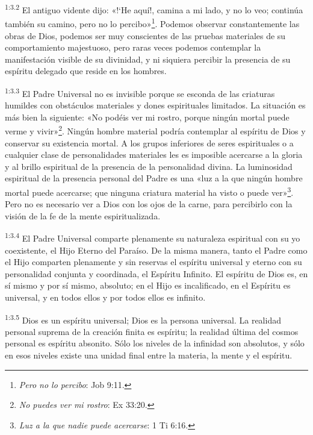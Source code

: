 \par
\textsuperscript{1:3.2} El antiguo vidente dijo: «!`He aquí!, camina a mi lado, y no lo veo; continúa también su camino, pero no lo percibo»\footnote{\textit{Pero no lo percibo}: Job 9:11.}. Podemos observar constantemente las obras de Dios, podemos ser muy conscientes de las pruebas materiales de su comportamiento majestuoso, pero raras veces podemos contemplar la manifestación visible de su divinidad, y ni siquiera percibir la presencia de su espíritu delegado que reside en los hombres.

\par
\textsuperscript{1:3.3} El Padre Universal no es invisible porque se esconda de las criaturas humildes con obstáculos materiales y dones espirituales limitados. La situación es más bien la siguiente: «No podéis ver mi rostro, porque ningún mortal puede verme y vivir»\footnote{\textit{No puedes ver mi rostro}: Ex 33:20.}. Ningún hombre material podría contemplar al espíritu de Dios y conservar su existencia mortal. A los grupos inferiores de seres espirituales o a cualquier clase de personalidades materiales les es imposible acercarse a la gloria y al brillo espiritual de la presencia de la personalidad divina. La luminosidad espiritual de la presencia personal del Padre es una «luz a la que ningún hombre mortal puede acercarse; que ninguna criatura material ha visto o puede ver»\footnote{\textit{Luz a la que nadie puede acercarse}: 1 Ti 6:16.}. Pero no es necesario ver a Dios con los ojos de la carne, para percibirlo con la visión de la fe de la mente espiritualizada.

\par
\textsuperscript{1:3.4} El Padre Universal comparte plenamente su naturaleza espiritual con su yo coexistente, el Hijo Eterno del Paraíso. De la misma manera, tanto el Padre como el Hijo comparten plenamente y sin reservas el espíritu universal y eterno con su personalidad conjunta y coordinada, el Espíritu Infinito. El espíritu de Dios es, en sí mismo y por sí mismo, absoluto; en el Hijo es incalificado, en el Espíritu es universal, y en todos ellos y por todos ellos es infinito.

\par
\textsuperscript{1:3.5} Dios es un espíritu universal; Dios es la persona universal. La realidad personal suprema de la creación finita es espíritu; la realidad última del cosmos personal es espíritu absonito. Sólo los niveles de la infinidad son absolutos, y sólo en esos niveles existe una unidad final entre la materia, la mente y el espíritu.

